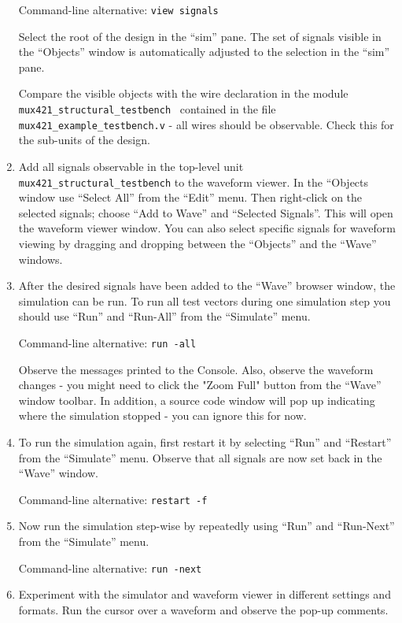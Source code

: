 \documentclass[a4paper,11pt]{article}
\begin{document}
\begin{enumerate}
  Command-line alternative: \verb#view signals#
    
  Select the root of the design in the ``sim'' pane.  The set of signals
  visible in the ``Objects'' window is automatically adjusted to the selection in
  the ``sim'' pane. 
  
  Compare the visible objects with the wire declaration in the module
  \verb#mux421_structural_testbench# \ contained in the file
  \verb#mux421_example_testbench.v# - all wires should be observable. Check
  this for the sub-units of the design.
  
\item Add all signals observable in the top-level unit
  \verb#mux421_structural_testbench# to the waveform viewer. In the ``Objects
  window use ``Select All'' from the ``Edit'' menu. Then right-click on the
  selected signals; choose ``Add to Wave'' and ``Selected Signals''. This will
  open the waveform viewer window.  You can also select specific signals for
  waveform viewing by dragging and dropping between the ``Objects'' and the
  ``Wave'' windows. 
  
\item After the desired signals have been added to the ``Wave'' browser window,
  the simulation can be run. To run all test vectors during one simulation step
  you should use ``Run'' and ``Run-All'' from the ``Simulate'' menu.

  Command-line alternative: \verb#run -all#
  
  Observe the messages printed to the Console. Also, observe the waveform
  changes - you might need to click the "Zoom Full" button from the ``Wave''
  window toolbar. In addition, a source code window will pop up indicating
  where the simulation stopped - you can ignore this for now.
    
\item To run the simulation again, first restart it by selecting ``Run'' and
  ``Restart'' from the ``Simulate'' menu. Observe that all signals are now set
  back in the ``Wave'' window. 
  
  Command-line alternative: \verb#restart -f#
  
\item Now run the simulation step-wise by repeatedly using ``Run'' and
  ``Run-Next'' from the ``Simulate'' menu.

  Command-line alternative: \verb#run -next#

\item Experiment with the simulator and waveform viewer in different settings
  and formats. Run the cursor over a waveform and observe the pop-up comments. 

\end{enumerate}
\end{document}
